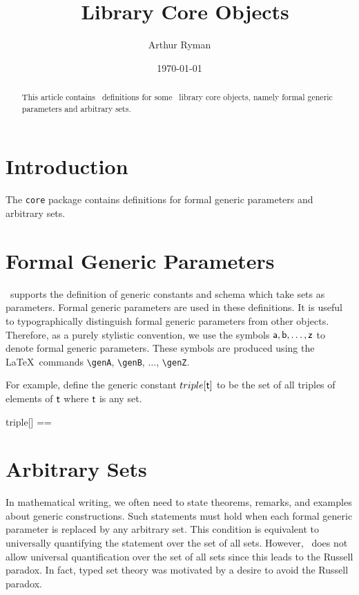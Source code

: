 \documentclass{amsart}
\begin{document}
\title{\mathz\ Library Core Objects}
\author{Arthur Ryman}
\date{\today}

\begin{abstract}
This article contains \ZN\ definitions for some  \mathz\ library core objects,
namely formal generic parameters and arbitrary sets.
\end{abstract}

\maketitle

\tableofcontents

\section{Introduction}

The \texttt{core} package contains definitions for formal generic parameters and arbitrary sets.

\section{Formal Generic Parameters}

\ZN\ supports the definition of generic constants and schema which take sets as parameters.
Formal generic parameters are used in these definitions.
It is useful to typographically distinguish formal generic parameters from other objects.
Therefore, as a purely stylistic convention, we use the symbols $\mathsf{a}, \mathsf{b}, \dots, \mathsf{z}$ to denote formal generic parameters.
These symbols are produced using the \LaTeX\ commands \verb|\genA|, \verb|\genB|, $\dots$, \verb|\genZ|.

For example, define the generic constant $triple[\mathsf{t}]$ to be the set of all triples of elements of $\mathsf{t}$ 
where $\mathsf{t}$ is any set.
\begin{zed}
	triple[\genT] == \genT \cross \genT \cross \genT
\end{zed}

\section{Arbitrary Sets}

In mathematical writing, we often need to state theorems, remarks, and examples about generic constructions.
Such statements must hold when each formal generic parameter is replaced by any arbitrary set.
This condition is equivalent to universally quantifying the statement over the set of all sets.
However, \ZN\ does not allow universal quantification over the set of all sets since this leads to the Russell paradox.
In fact, typed set theory was motivated by a desire to avoid the Russell paradox.
\end{document}
